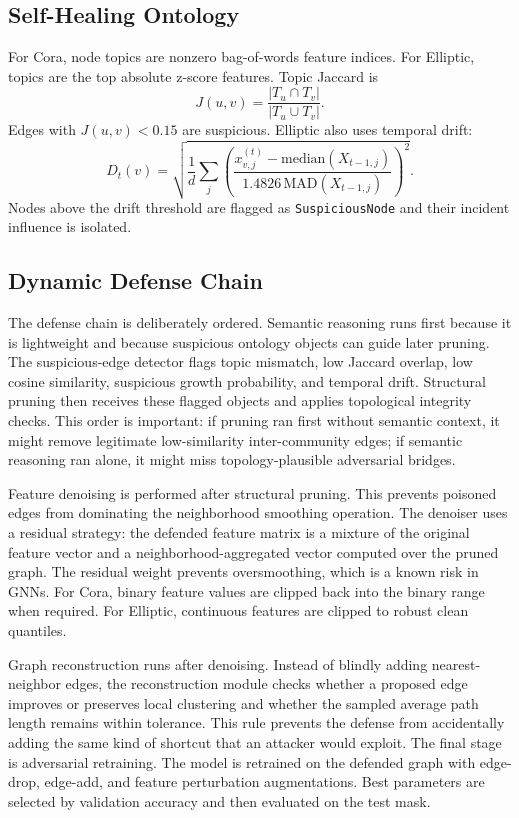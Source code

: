 \documentclass[12pt,oneside]{report}
\begin{document}
\subsection{Self-Healing Ontology}
For Cora, node topics are nonzero bag-of-words feature indices. For Elliptic, topics are the top absolute z-score features. Topic Jaccard is
\begin{equation}
J(u,v)=\frac{|T_u\cap T_v|}{|T_u\cup T_v|}.
\end{equation}
Edges with \(J(u,v)<0.15\) are suspicious. Elliptic also uses temporal drift:
\begin{equation}
D_t(v)=\sqrt{\frac{1}{d}\sum_j\left(\frac{x_{v,j}^{(t)}-\mathrm{median}(X_{t-1,j})}{1.4826\,\mathrm{MAD}(X_{t-1,j})}\right)^2}.
\end{equation}
Nodes above the drift threshold are flagged as \texttt{SuspiciousNode} and their incident influence is isolated.

\subsection{Dynamic Defense Chain}
The defense chain is deliberately ordered. Semantic reasoning runs first because it is lightweight and because suspicious ontology objects can guide later pruning. The suspicious-edge detector flags topic mismatch, low Jaccard overlap, low cosine similarity, suspicious growth probability, and temporal drift. Structural pruning then receives these flagged objects and applies topological integrity checks. This order is important: if pruning ran first without semantic context, it might remove legitimate low-similarity inter-community edges; if semantic reasoning ran alone, it might miss topology-plausible adversarial bridges.

Feature denoising is performed after structural pruning. This prevents poisoned edges from dominating the neighborhood smoothing operation. The denoiser uses a residual strategy: the defended feature matrix is a mixture of the original feature vector and a neighborhood-aggregated vector computed over the pruned graph. The residual weight prevents oversmoothing, which is a known risk in GNNs. For Cora, binary feature values are clipped back into the binary range when required. For Elliptic, continuous features are clipped to robust clean quantiles.

Graph reconstruction runs after denoising. Instead of blindly adding nearest-neighbor edges, the reconstruction module checks whether a proposed edge improves or preserves local clustering and whether the sampled average path length remains within tolerance. This rule prevents the defense from accidentally adding the same kind of shortcut that an attacker would exploit. The final stage is adversarial retraining. The model is retrained on the defended graph with edge-drop, edge-add, and feature perturbation augmentations. Best parameters are selected by validation accuracy and then evaluated on the test mask.
\end{document}
